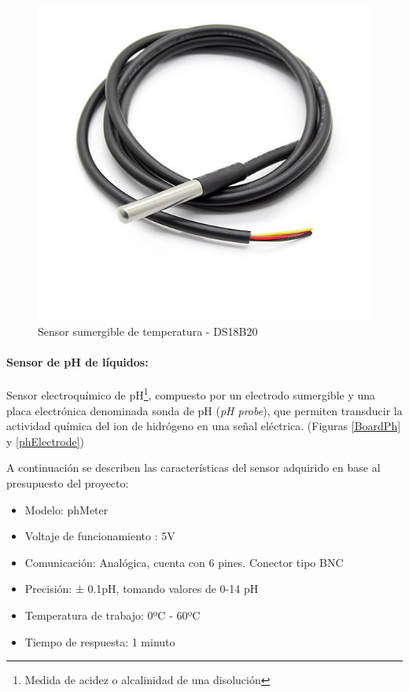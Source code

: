                 \begin{figure}
                    \centering
                    \includegraphics[scale=0.25]{hardware/ds18b20.jpg}
                    \caption{Sensor sumergible de temperatura - DS18B20}
                    \label{SensorTemp}
                \end{figure}
                
            \paragraph{Sensor de pH de líquidos:}Sensor electroquímico de pH\footnote{ Medida de acidez o alcalinidad de una disolución}, compuesto por un electrodo sumergible y una placa electrónica denominada sonda de pH (\textit{pH probe}), que permiten transducir la actividad química del ion de hidrógeno en una señal eléctrica. (Figuras \ref{BoardPh} y \ref{phElectrode})
                
                \par A continuación se describen las características del sensor adquirido en base al presupuesto del proyecto:
                
                \begin{itemize}
                    \item Modelo: phMeter
                    \item Voltaje de funcionamiento : 5V
                    \item Comunicación: Analógica, cuenta con 6 pines. Conector tipo BNC
                    \item Precisión: ± 0.1pH, tomando valores de 0-14 pH
                    \item Temperatura de trabajo: 0ºC - 60ºC
                    \item Tiempo de respuesta: 1 minuto
                \end{itemize}
                

